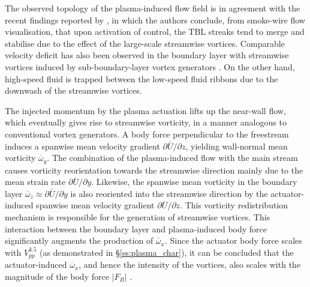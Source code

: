 The observed topology of the plasma-induced flow field is in agreement with the recent findings reported by \citet{cheng_wong_hussain_schroder_zhou_2021}, in which the authors conclude, from smoke-wire flow visualisation, that upon activation of control, the TBL streaks tend to merge and stabilise due to the effect of the large-scale streamwise vortices. Comparable velocity deficit has also been observed in the boundary layer with streamwise vortices induced by sub-boundary-layer vortex generators \citep{Sandborn1981}. On the other hand, high-speed fluid is trapped between the low-speed fluid ribbons due to the downwash of the streamwise vortices.

The injected momentum by the plasma actuation lifts up the near-wall flow, which eventually gives rise to streamwise vorticity, in a manner analogous to conventional vortex generators. A body force perpendicular to the freestream induces a spanwise mean velocity gradient $\partial\bar{U}/\partial z$, yielding wall-normal mean vorticity $\overline{\omega}_y$. The combination of the plasma-induced flow with the main stream causes vorticity reorientation towards the streamwise direction mainly due to the mean strain rate $\partial\bar{U}/\partial y$. Likewise, the spanwise mean vorticity in the boundary layer $\overline{\omega}_z\approx\partial\bar{U}/\partial y$ is also reoriented into the streamwise direction by the actuator-induced spanwise mean velocity gradient $\partial\bar{U}/\partial z$. This vorticity redistribution mechanism is responsible for the generation of streamwise vortices. This interaction between the boundary layer and plasma-induced body force significantly augments the production of $\overline{\omega}_x$. Since the actuator body force scales with $V_{pp}^{3.5}$ (as demonstrated in \S\ref{ss:plasma_char}), it can be concluded that the actuator-induced $\overline{\omega}_x$, and hence the intensity of the vortices, also scales with the magnitude of the body force $|F_B|$ \citep{Wicks2015}.

